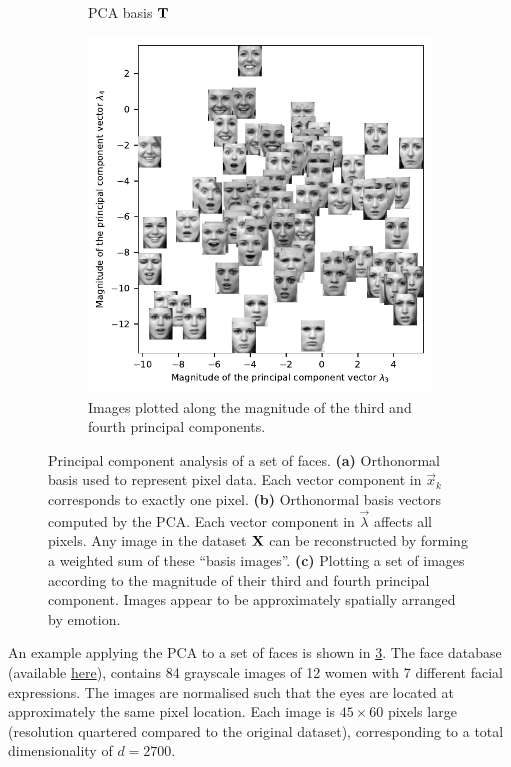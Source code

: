 \documentclass[10pt,letterpaper,oneside]{article}
\begin{document}
\begin{figure}[p]
\begin{subfigure}{0.5\textwidth}
		\caption{PCA basis ${\mathbf{T}}$}
		\label{fig:eigenfaces}
	\end{subfigure}
	\begin{subfigure}{\textwidth}
		\centering
		\includegraphics[scale=0.9]{media/eigenfaces_dim_2_3.pdf}		
		\caption{Images plotted along the magnitude of the third and fourth principal components.}
		\label{fig:eigenfaces_dim_2_3}
	\end{subfigure}
	\caption{Principal component analysis of a set of faces. \textbf{(a)} Orthonormal basis used to represent pixel data. Each vector component in $\vec x_k$ corresponds to exactly one pixel. \textbf{(b)} Orthonormal basis vectors computed by the PCA. Each vector component in $\vec \lambda$ affects all pixels. Any image in the dataset ${\mathbf{X}}$ can be reconstructed by forming a weighted sum of these \enquote{basis images}. \textbf{(c)} Plotting a set of images according to the magnitude of their third and fourth principal component. Images appear to be approximately spatially arranged by emotion. }
	\label{fig:pca_faces}
\end{figure}

An example applying the PCA to a set of faces is shown in \cref{fig:pca_faces}. The face database (available \href{http://pics.stir.ac.uk/2D_face_sets.htm}{here}), contains 84 grayscale images of 12 women with 7 different facial expressions. The images are normalised such that the eyes are located at approximately the same pixel location. Each image is $45 \times 60$ pixels large (resolution quartered compared to the original dataset), corresponding to a total dimensionality of $d = 2700$.
\end{document}
